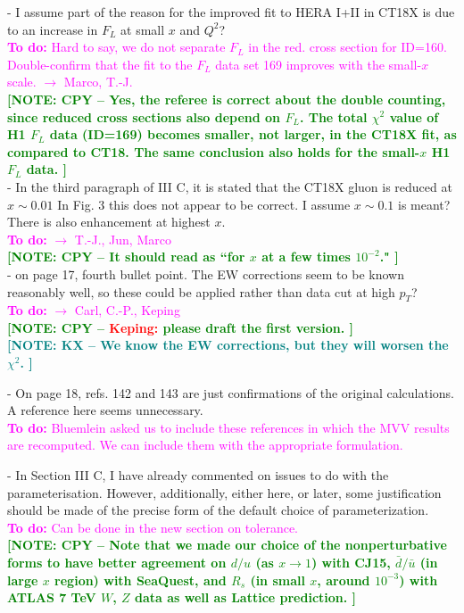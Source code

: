 \documentclass[aps,prd,amsmath,nofootinbib,floatfix,fleqn]{revtex4}
\newcommand{\TODO}[1]{\textcolor{magenta}{
\quad\vspace{3pt} \\ {\bf To do:} #1 \\
}}
\newcommand{\NOTECPY}[1]{\textcolor{green}{ \bf[NOTE: CPY -- #1 ]}}
\newcommand{\NOTEKX}[1]{\textcolor{teal}{ \bf[NOTE: KX -- #1 ]}}
\begin{document}
- I assume part of the reason for the improved fit to HERA I+II in CT18X is due
to an increase in $F_L$ at small $x$ and $Q^2$?
\TODO{Hard to say, we do not separate $F_L$ in the red. cross section for ID=160. Double-confirm that the fit to the $F_L$ data set 169 improves with the small-$x$ scale. $\to$ Marco, T.-J.}
\NOTECPY{Yes, the referee is correct about the double counting, since reduced cross sections also depend on $F_L$. The total $\chi^2$ value of H1 $F_L$ data (ID=169) becomes smaller, not larger, in the CT18X fit, as compared to CT18. The same conclusion also holds for the small-$x$ H1 $F_L$ data.}\\

- In the third paragraph of III C, it is stated that the CT18X gluon is reduced
at $x\sim 0.01$ In Fig. 3 this does not appear to be correct. I assume $x\sim
0.1$ is meant? There is also enhancement at highest $x$.
\TODO{$\to$ T.-J., Jun, Marco}
\NOTECPY{It should read as ``for $x$ at a few times $10^{-2}$."}\\

- on page 17, fourth bullet point. The EW corrections seem to be known
reasonably well, so these could be applied rather than data cut at high $p_T$?
\TODO{$\to$ Carl, C.-P., Keping}
\NOTECPY{\textcolor{red}{Keping:} please draft the first version. }\\
\NOTEKX{We know the EW corrections, but they will worsen the $\chi^2$.}

- On page 18, refs. 142 and 143 are just confirmations of the original
calculations. A reference here seems unnecessary.
\TODO{Bluemlein asked us to include these references in which the MVV results are recomputed. We can include them with the appropriate formulation.}

- In Section III C, I have already commented on issues to do with the
parameterisation. However, additionally, either here, or later, some
justification should be made of the precise form of the default choice of
parameterization.
\TODO{Can be done in the new section on tolerance.}
\NOTECPY{Note that we made our choice of the nonperturbative forms to have better agreement on $d/u$ (as $x \to 1$) with CJ15, ${\bar d}/{\bar u}$ (in large $x$ region) with SeaQuest, and $R_s$ (in small $x$, around $10^{-3}$) with ATLAS 7 TeV $W$, $Z$ data as well as Lattice prediction.
}\\
\end{document}
